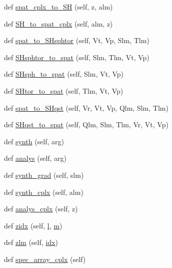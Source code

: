 \begin{DoxyCompactItemize}
\item 
def \hyperlink{classshtns_1_1sht_a3bf0d75fd42d5ddf6a18f043ab13c950}{spat\+\_\+cplx\+\_\+to\+\_\+\+S\+H} (self, z, alm)
\item 
def \hyperlink{classshtns_1_1sht_a27969d87b06cffacfe570bc43202dc2d}{S\+H\+\_\+to\+\_\+spat\+\_\+cplx} (self, alm, z)
\item 
def \hyperlink{classshtns_1_1sht_ab88585c8224b88412ec34c54a633b18c}{spat\+\_\+to\+\_\+\+S\+Hsphtor} (self, Vt, Vp, Slm, Tlm)
\item 
def \hyperlink{classshtns_1_1sht_ac1b531553998c4458fd7cd9d53825895}{S\+Hsphtor\+\_\+to\+\_\+spat} (self, Slm, Tlm, Vt, Vp)
\item 
def \hyperlink{classshtns_1_1sht_a1af2f9fb15224a8db86e243fb33684ea}{S\+Hsph\+\_\+to\+\_\+spat} (self, Slm, Vt, Vp)
\item 
def \hyperlink{classshtns_1_1sht_aeee980ebafde7bf958364140499e6a25}{S\+Htor\+\_\+to\+\_\+spat} (self, Tlm, Vt, Vp)
\item 
def \hyperlink{classshtns_1_1sht_a7c0f6b13244350cc36d35ee2820b40c2}{spat\+\_\+to\+\_\+\+S\+Hqst} (self, Vr, Vt, Vp, Qlm, Slm, Tlm)
\item 
def \hyperlink{classshtns_1_1sht_adf5cc1ac14d72a3f9ac7d93fe32598c6}{S\+Hqst\+\_\+to\+\_\+spat} (self, Qlm, Slm, Tlm, Vr, Vt, Vp)
\item 
def \hyperlink{classshtns_1_1sht_a450ed0fdd98bcdfcfd3905ca443b0dc1}{synth} (self, arg)
\item 
def \hyperlink{classshtns_1_1sht_af990e9c03d058da61b9d2801c8620ffc}{analys} (self, arg)
\item 
def \hyperlink{classshtns_1_1sht_acd723a30b6fb027bd5effffbbe4e8cb4}{synth\+\_\+grad} (self, slm)
\item 
def \hyperlink{classshtns_1_1sht_a9440b21fb8debe5d3495e1552c99e14f}{synth\+\_\+cplx} (self, alm)
\item 
def \hyperlink{classshtns_1_1sht_aa7b5638e51acf6f1dac7650aa75b23c7}{analys\+\_\+cplx} (self, z)
\item 
def \hyperlink{classshtns_1_1sht_a84e044566b16fd6aebcc7032b260041b}{zidx} (self, \hyperlink{classshtns_1_1sht_afbfbd4354cf2721b21cc5cac5b7f0cb1}{l}, \hyperlink{classshtns_1_1sht_a629d4d76e7d9331ff17849dd46d32843}{m})
\item 
def \hyperlink{classshtns_1_1sht_ab4515ff04d92106d937d109f1a36b95b}{zlm} (self, \hyperlink{classshtns_1_1sht_ac2c888b97bc13f2dffe988bc998089e8}{idx})
\item 
def \hyperlink{classshtns_1_1sht_a4bfbe35197afc041a4ee1fb1341effb1}{spec\+\_\+array\+\_\+cplx} (self)

\end{DoxyCompactItemize}
